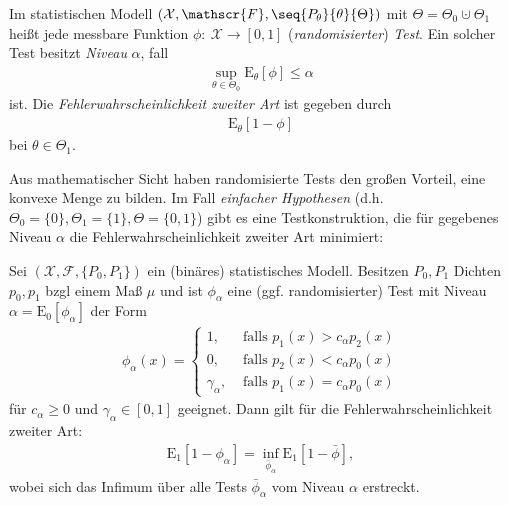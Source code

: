 \documentclass[a4paper]{scrartcl}
\begin{document}
		\begin{definition}
			Im statistischen Modell $\left(\mathcal{X},\mathscr{F},\seq{P_\theta}{\theta}{\Theta}\right)$ mit $\Theta=\Theta_0\cupdot\Theta_1$ heißt jede messbare Funktion $\phi\colon~\mathcal{X}\to[0,1]$ (\emph{randomisierter}) \emph{Test}. Ein solcher Test besitzt \emph{Niveau} $\alpha$, fall
			\begin{align*}
				\sup_{\theta\in\Theta_0}\mathrm{E}_\theta[\phi]\le\alpha
			\end{align*}
			ist. Die \emph{Fehlerwahrscheinlichkeit zweiter Art} ist gegeben durch
			\begin{align*}
				\mathrm{E}_\theta[1-\phi]
			\end{align*}
			bei $\theta\in\Theta_1$.
		\end{definition}
		\begin{remark}
			Aus mathematischer Sicht haben randomisierte Tests den großen Vorteil, eine konvexe Menge zu bilden. Im Fall \emph{einfacher Hypothesen} (d.h. $\Theta_0=\{0\},\Theta_1=\{1\},\Theta=\{0,1\}$) gibt es eine Testkonstruktion, die für gegebenes Niveau $\alpha$ die Fehlerwahrscheinlichkeit zweiter Art minimiert:
		\end{remark}
		\begin{lemma}\label{NP-Lemma}
			Sei $\left(\mathcal{X},\mathscr{F},\{P_0,P_1\}\right)$ ein (binäres) statistisches Modell. Besitzen $P_0,P_1$ Dichten $p_0,p_1$ bzgl einem Maß $\mu$ und ist $\phi_\alpha$ eine (ggf. randomisierter) Test mit Niveau $\alpha=\mathrm{E}_0\left[\phi_\alpha\right]$ der Form
			\begin{align*}
				\phi_\alpha(x)=\begin{cases}1,&\text{ falls }p_1(x)>c_\alpha p_2(x)\\0,&\text{ falls }p_2(x)<c_\alpha p_0(x)\\\gamma_\alpha,&\text{ falls }p_1(x)=c_\alpha p_0(x)\end{cases}
			\end{align*}			
			für $c_\alpha\ge 0$ und $\gamma_\alpha\in[0,1]$ geeignet. Dann gilt für die Fehlerwahrscheinlichkeit zweiter Art:
			\begin{align*}
				\mathrm{E}_1\left[1-\phi_\alpha\right]=\inf_{\bar{\phi}_\alpha}\mathrm{E}_1\left[1-\bar{\phi}\right],
			\end{align*}
			wobei sich das Infimum über alle Tests $\bar{\phi}_\alpha$ vom Niveau $\alpha$ erstreckt.
		\end{lemma}
\end{document}
